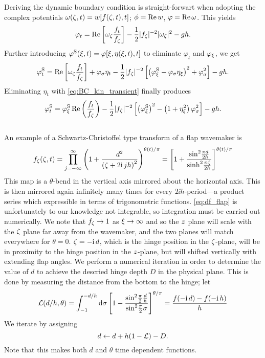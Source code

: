 Deriving the dynamic boundary condition is straight-forwart when adopting the complex potentials $\omega(\zeta,t)=w[f(\zeta,t),t]$; $\phi=\operatorname{Re}w$, $\varphi = \operatorname{Re}\omega$.
This yields
\begin{equation}
\varphi_t = \operatorname{Re}\left[\omega_\zeta \frac{f_t}{f_\zeta}\right] - \frac12|f_\zeta|^{-2}|\omega_\zeta|^2 - gh.
\label{eq:}
\end{equation}
Further introducing $\varphi^\mathrm{S}(\xi,t)=\varphi[\xi,\eta(\xi,t),t]$ to eliminate $\varphi_t$ and $\varphi_\xi$, we get 
\begin{equation*}
\varphi^\mathrm{S}_t =\operatorname{Re}\left[\omega_\zeta \frac{f_t}{f_\zeta}\right] + \varphi_\sigma \eta_t
 - \frac12|f_\zeta|^{-2}\left[\left(\varphi^\mathrm{S}_\xi-\varphi_\sigma\eta_\xi\right)^2+\varphi_\sigma^2\right] - gh.
\end{equation*}
%
Eliminating $\eta_t$ with \eqref{eq:BC_kin_transient} finally produces
\begin{equation}
\varphi^\mathrm{S}_t =  \varphi^\mathrm{S}_\xi \operatorname{Re}\left( \frac{f_t}{f_\zeta}\right)
 - \frac12|f_\zeta|^{-2}\left[\left(\varphi^\mathrm{S}_\xi\right)^2-\left(1+\eta_\xi^2\right)\varphi_\sigma^2\right] - gh.
\label{eq:BC_dyn_transient}
\end{equation}
\\

An example of a Schwartz-Christoffel type transform of a flap wavemaker is
\begin{equation}
f_\zeta(\zeta,t) = \prod_{j=-\infty}^\infty \left(1+\frac{d^2}{\left(\zeta+2\mathrm{i}\, j h\right)^2}\right)^{\theta(t)/\pi}
= \left[1+\frac{\sin^2\!\frac{\pi d}{2h}}{\sinh^2\!\frac{\pi \zeta}{2h}}\right]^{\theta(t)/\pi}
\label{eq:df_flap}
\end{equation}
This map is a $\theta$-bend in the vertical axis mirrored about the horizontal axis.
This is then mirrored again infinitely many times for every $2\ii h$-period---a product series which expressible in terms of trigonometric functions.
\eqref{eq:df_flap} is unfortunately to our knowledge not integrable, so integration must be carried out numerically. 
We note that $f_\zeta\to1$ as $\xi\to\infty$ and so the $z$ plane will scale with the $\zeta$ plane far away from the wavemaker, and the two planes will match everywhere for $\theta=0$. $\zeta=-\mathrm{i}\, d$, which is the hinge position in the $\zeta$-plane, will be in proximity to the hinge position in the $z$-plane, but will shifted vertically with extending flap angles. We perform a numerical iteration in order to determine the value of $d$ to achieve the descried hinge depth $D$ in the physical plane. This is done by measuring the distance from the bottom to the hinge;
let
\begin{equation}
\mathcal L(d/h,\theta) = \int_{-1}^{-d/h} \mathrm d \sigma \left[1-\frac{\sin^2\!\frac{\pi}{2}\frac{d}{h}}{\sin^2\!\frac{\pi}{2}\sigma}\right]^{\theta/\pi} = \frac{f(-\mathrm{i}\, d)-f(-\mathrm{i}\, h)}h
\label{eq:L}
\end{equation}
We iterate by assigning
\[
d\leftarrow d + h(1-\mathcal L) - D.
\]
Note that this makes both $d$ and $\theta$ time dependent functions.
 
